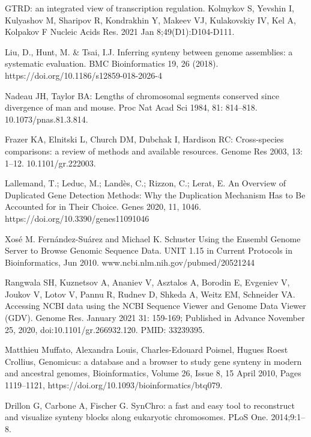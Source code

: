 \documentclass[12pt]{article}
\begin{document}


\normalsize
\begin{thebibliography}{99}

 GTRD: an integrated view of transcription regulation.
Kolmykov S, Yevshin I, Kulyashov M, Sharipov R, Kondrakhin Y, Makeev VJ,
Kulakovskiy IV, Kel A, Kolpakov F Nucleic Acids Res. 2021 Jan
8;49(D1):D104-D111.

 Liu, D., Hunt, M. \& Tsai, I.J. Inferring synteny between
genome assemblies: a systematic evaluation. BMC Bioinformatics 19, 26 (2018).
https://doi.org/10.1186/s12859-018-2026-4

 Nadeau JH, Taylor BA: Lengths of chromosomal segments
conserved since divergence of man and mouse. Proc Nat Acad Sci 1984,
81: 814–818. 10.1073/pnas.81.3.814.

 Frazer KA, Elnitski L, Church DM, Dubchak I, Hardison RC:
Cross-species comparisons: a review of methods and available resources.
Genome Res 2003, 13: 1–12. 10.1101/gr.222003.

 Lallemand, T.; Leduc, M.; Landès, C.; Rizzon, C.; Lerat, E.
An Overview of Duplicated Gene Detection Methods: Why the Duplication Mechanism
Has to Be Accounted for in Their Choice. Genes 2020, 11, 1046.
https://doi.org/10.3390/genes11091046

 Xosé M. Fernández-Suárez and Michael K. Schuster
Using the Ensembl Genome Server to Browse Genomic Sequence Data.
UNIT 1.15 in Current Protocols in Bioinformatics, Jun 2010.
www.ncbi.nlm.nih.gov/pubmed/20521244

 Rangwala SH, Kuznetsov A, Ananiev V, Asztalos A, Borodin E,
Evgeniev V, Joukov V, Lotov V, Pannu R, Rudnev D, Shkeda A, Weitz EM, Schneider
VA. Accessing NCBI data using the NCBI Sequence Viewer and Genome Data Viewer
(GDV). Genome Res. January 2021 31: 159-169; Published in Advance November 25,
2020, doi:10.1101/gr.266932.120. PMID: 33239395.

 Matthieu Muffato, Alexandra Louis, Charles-Edouard Poisnel,
Hugues Roest Crollius, Genomicus: a database and a browser to study gene
synteny in modern and ancestral genomes, Bioinformatics, Volume 26, Issue 8,
15 April 2010, Pages 1119–1121, https://doi.org/10.1093/bioinformatics/btq079.

 Drillon G, Carbone A, Fischer G. SynChro: a fast and easy
tool to reconstruct and visualize synteny blocks along eukaryotic chromosomes.
PLoS One. 2014;9:1–8.


\end{thebibliography}
\end{document}
